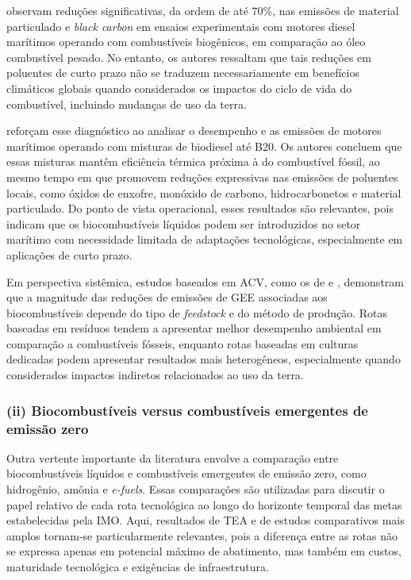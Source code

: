 \citet{petzold_operation_2011} observam reduções significativas, da ordem de até 70\%, nas emissões de material particulado e \emph{black carbon} em ensaios experimentais com motores diesel marítimos operando com combustíveis biogênicos, em comparação ao óleo combustível pesado. No entanto, os autores ressaltam que tais reduções em poluentes de curto prazo não se traduzem necessariamente em benefícios climáticos globais quando considerados os impactos do ciclo de vida do combustível, incluindo mudanças de uso da terra.

\citet{altarazi_effects_2022} reforçam esse diagnóstico ao analisar o desempenho e as emissões de motores marítimos operando com misturas de biodiesel até B20. Os autores concluem que essas misturas mantêm eficiência térmica próxima à do combustível fóssil, ao mesmo tempo em que promovem reduções expressivas nas emissões de poluentes locais, como óxidos de enxofre, monóxido de carbono, hidrocarbonetos e material particulado. Do ponto de vista operacional, esses resultados são relevantes, pois indicam que os biocombustíveis líquidos podem ser introduzidos no setor marítimo com necessidade limitada de adaptações tecnológicas, especialmente em aplicações de curto prazo.

Em perspectiva sistêmica, estudos baseados em \gls{ACV}, como os de \citet{masum_comparing_2023} e \citet{international_council_on_clean_transportation_potential_2021}, demonstram que a magnitude das reduções de emissões de \gls{GEE} associadas aos biocombustíveis depende do tipo de \emph{feedstock} e do método de produção. Rotas baseadas em resíduos tendem a apresentar melhor desempenho ambiental em comparação a combustíveis fósseis, enquanto rotas baseadas em culturas dedicadas podem apresentar resultados mais heterogêneos, especialmente quando considerados impactos indiretos relacionados ao uso da terra.

\subsubsection{(ii) Biocombustíveis versus combustíveis emergentes de emissão zero}
Outra vertente importante da literatura envolve a comparação entre biocombustíveis líquidos e combustíveis emergentes de emissão zero, como hidrogênio, amônia e \emph{e-fuels}. Essas comparações são utilizadas para discutir o papel relativo de cada rota tecnológica ao longo do horizonte temporal das metas estabelecidas pela \gls{IMO}. Aqui, resultados de \gls{TEA} e de estudos comparativos mais amplos tornam-se particularmente relevantes, pois a diferença entre as rotas não se expressa apenas em potencial máximo de abatimento, mas também em custos, maturidade tecnológica e exigências de infraestrutura.

